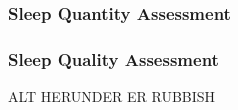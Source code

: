 \documentclass[12pt]{article} %
\begin{document}
\subsubsection{Sleep Quantity Assessment}



\subsubsection{Sleep Quality Assessment}



\newpage
ALT HERUNDER ER RUBBISH
\end{document}

